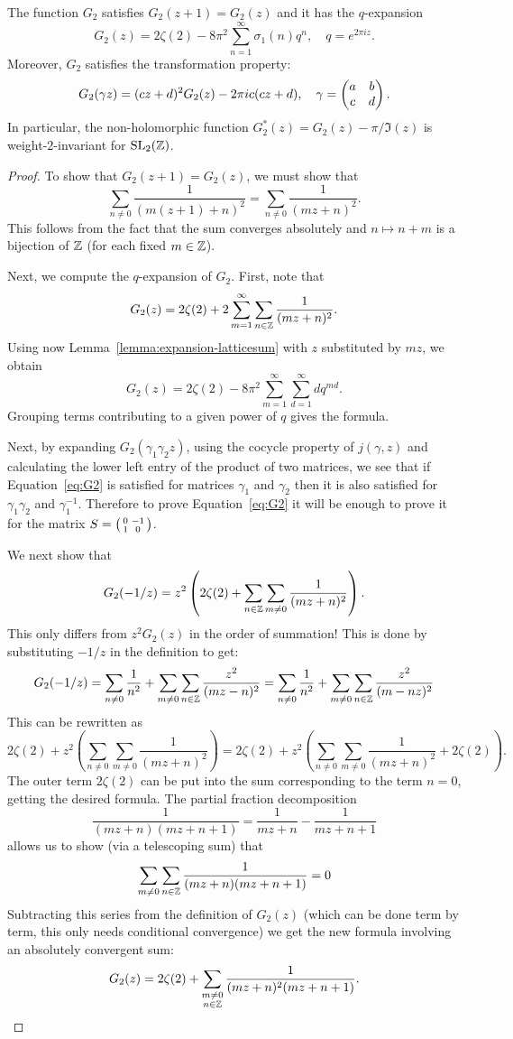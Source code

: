 \begin{theorem}
The function  $G_2$ satisfies $G_2(z+1)=G_2(z)$ and  it has the $q$-expansion
\[
G_2(z) = 2\zeta(2) - 8\pi^2\sum_{n=1}^\infty \sigma_1(n)q^n,\quad q=e^{2\pi i z}.
\]
Moreover, $G_2$ satisfies the transformation property:
\begin{equation}
\label{eq:G2}
G_2(\gamma z) = (cz+d)^2G_2(z)- 2\pi i c(cz+d),\quad \gamma=\left(\begin{matrix}a&b\\c&d\end{matrix}\right).
\end{equation}
In particular, the non-holomorphic function  $G_2^*(z) = G_2(z)-\pi/\Im(z)$ is weight-$2$-invariant for $\operatorname{SL}_2(\mathbb{Z})$.
\end{theorem}
\begin{proof}

To show that $G_2(z+1)=G_2(z)$, we must show that
\[
\sum_{n\neq 0}\frac{1}{(m(z+1)+n)^2} = \sum_{n\neq 0} \frac{1}{(mz+n)^2}.
\]
This follows from the fact that the sum converges absolutely and $n\mapsto n+m$ is a bijection of $\mathbb{Z}$ (for each fixed $m\in\mathbb{Z}$).

Next, we compute the $q$-expansion of $G_2$. First, note that
\[
G_2(z)=2\zeta(2)+2\sum_{m=1}^\infty \sum_{n\in\mathbb{Z}}\frac{1}{(mz+n)^2}.
\]
Using now Lemma~\ref{lemma:expansion-latticesum} with $z$ substituted by $mz$, we obtain
\[
G_2(z)=2\zeta(2)-8\pi^2\sum_{m=1}^\infty\sum_{d=1}^\infty dq^{md}.
\]
Grouping terms contributing to a given power of $q$ gives the formula.

Next, by expanding $G_2(\gamma_1\gamma_2z)$, using the cocycle property of $j(\gamma,z)$ and calculating the lower left entry of the product of two matrices, we see that if Equation~\ref{eq:G2} is satisfied for matrices $\gamma_1$ and $\gamma_2$ then it is also satisfied for $\gamma_1\gamma_2$ and $\gamma_1^{-1}$. Therefore to prove Equation~\ref{eq:G2} it will be enough to prove it for the matrix $S=\left(\begin{smallmatrix}0&-1\\1&0\end{smallmatrix}\right)$.

We next show that
\[
G_2(-1/z) = z^2 \left(2\zeta(2) + \sum_{n\in\mathbb{Z}}\sum_{m\neq 0}\frac{1}{(mz+n)^2}\right).
\]
This only differs from $z^2G_2(z)$ in the order of summation! This is done by substituting $-1/z$ in the definition to get:
\[
G_2(-1/z) = \sum_{n\neq 0} \frac 1{n^2} + \sum_{m\neq 0}\sum_{n\in\mathbb{Z}}\frac{z^2}{(mz-n)^2} = \sum_{n\neq 0} \frac 1{n^2} + \sum_{m\neq 0}\sum_{n\in\mathbb{Z}}\frac{z^2}{(m-nz)^2}
\]
This can be rewritten as
\[
2\zeta(2) + z^2\left(\sum_{n\neq 0}\sum_{m\neq 0}\frac{1}{(mz+n)^2}\right)=2\zeta(2)+z^2\left(\sum_{n\neq 0}\sum_{m\neq 0} \frac{1}{(mz+n)^2} + 2\zeta(2)\right).
\]
The outer term $2\zeta(2)$ can be put into the sum corresponding to the term $n=0$, getting the desired formula. The partial fraction decomposition
\[
\frac{1}{(mz+n)(mz+n+1)} = \frac{1}{mz+n}-\frac{1}{mz+n+1}
\]
allows us to show (via a telescoping sum) that
\[
\sum_{m\neq 0} \sum_{n\in\mathbb{Z}} \frac{1}{(mz+n)(mz+n+1)} = 0
\]
Subtracting this series from the definition of $G_2(z)$ (which can be done term by term, this only needs conditional convergence) we get the new formula involving an absolutely convergent sum:
\[
G_2(z)=2\zeta(2)+\sum_{\substack{m\neq 0\\n\in\mathbb{Z}}} \frac{1}{(mz+n)^2(mz+n+1)}.
\]


\end{proof}
